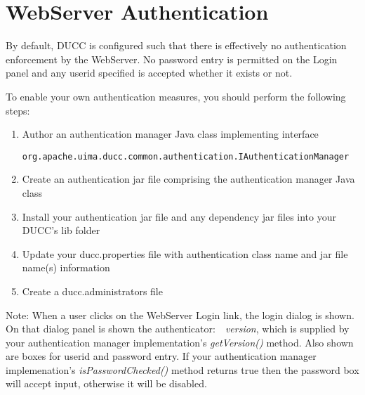 % 
% 
% 
% 
\section{WebServer Authentication}
\label{sec:WebServer Authentication}

    By default, DUCC is configured such that there is effectively no
    authentication enforcement by the WebServer. No password entry is permitted
    on the Login panel and any userid specified is accepted whether it exists or
    not.
    
    To enable your own authentication measures, you should perform the following
    steps:
    
    \begin{enumerate}
      \item Author an authentication manager Java class implementing interface
      \begin{verbatim}
org.apache.uima.ducc.common.authentication.IAuthenticationManager
      \end{verbatim}
      \item Create an authentication jar file comprising the
      authentication manager Java class
      \item Install your authentication jar file and any dependency jar files
      into your DUCC's lib folder
      \item Update your ducc.properties file with authentication class name
      and jar file name(s) information
      \item Create a ducc.administrators file
      \end{enumerate}
      
    Note: When a user clicks on the WebServer Login link, the login dialog is
    shown. On that dialog panel is shown the \mbox{authenticator: {\em
    version}}, which is supplied by your authentication manager implementation's {\em
    \mbox{getVersion()}} method. Also shown are boxes for userid and password
    entry. If your authentication manager implemenation's {\em \mbox{isPasswordChecked()}}
    method returns true then the password box will accept input, otherwise it will be
    disabled.
    
